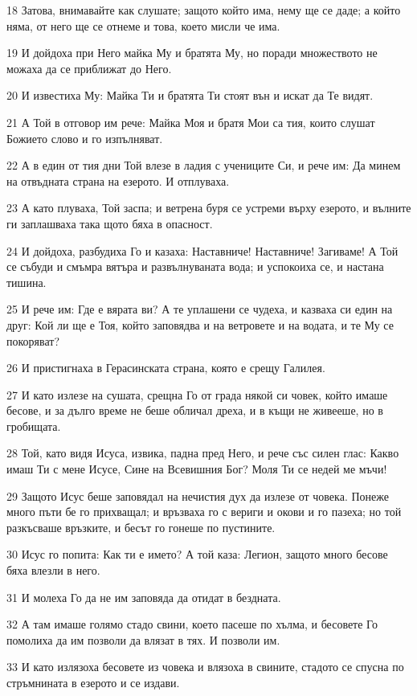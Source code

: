 \par 18 Затова, внимавайте как слушате; защото който има, нему ще се даде; а който няма, от него ще се отнеме и това, което мисли че има.
\par 19 И дойдоха при Него майка Му и братята Му, но поради множеството не можаха да се приближат до Него.
\par 20 И известиха Му: Майка Ти и братята Ти стоят вън и искат да Те видят.
\par 21 А Той в отговор им рече: Майка Моя и братя Мои са тия, които слушат Божието слово и го изпълняват.
\par 22 А в един от тия дни Той влезе в ладия с учениците Си, и рече им: Да минем на отвъдната страна на езерото. И отплуваха.
\par 23 А като плуваха, Той заспа; и ветрена буря се устреми върху езерото, и вълните ги заплашваха така щото бяха в опасност.
\par 24 И дойдоха, разбудиха Го и казаха: Наставниче! Наставниче! Загиваме! А Той се събуди и смъмра вятъра и развълнуваната вода; и успокоиха се, и настана тишина.
\par 25 И рече им: Где е вярата ви? А те уплашени се чудеха, и казваха си един на друг: Кой ли ще е Тоя, който заповядва и на ветровете и на водата, и те Му се покоряват?
\par 26 И пристигнаха в Герасинската страна, която е срещу Галилея.
\par 27 И като излезе на сушата, срещна Го от града някой си човек, който имаше бесове, и за дълго време не беше обличал дреха, и в къщи не живееше, но в гробищата.
\par 28 Той, като видя Исуса, извика, падна пред Него, и рече със силен глас: Какво имаш Ти с мене Исусе, Сине на Всевишния Бог? Моля Ти се недей ме мъчи!
\par 29 Защото Исус беше заповядал на нечистия дух да излезе от човека. Понеже много пъти бе го прихващал; и връзваха го с вериги и окови и го пазеха; но той разкъсваше връзките, и бесът го гонеше по пустините.
\par 30 Исус го попита: Как ти е името? А той каза: Легион, защото много бесове бяха влезли в него.
\par 31 И молеха Го да не им заповяда да отидат в бездната.
\par 32 А там имаше голямо стадо свини, което пасеше по хълма, и бесовете Го помолиха да им позволи да влязат в тях. И позволи им.
\par 33 И като излязоха бесовете из човека и влязоха в свините, стадото се спусна по стръмнината в езерото и се издави.
